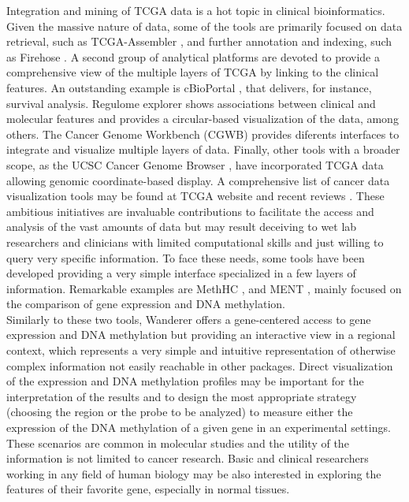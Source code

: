 \documentclass{bmcart}
\begin{document}
Integration and mining of TCGA data is a hot topic in clinical bioinformatics. Given the massive nature of data, some of the tools are primarily focused on data retrieval, such as TCGA-Assembler \cite{zhu2014tcga}, and further annotation and indexing, such as Firehose \cite{firehoseweb}. A second group of analytical platforms are devoted to provide a comprehensive view of the multiple layers of TCGA by linking to the clinical features. An outstanding example is cBioPortal \cite{gao2013integrative}, that delivers, for instance, survival analysis. Regulome explorer \cite{cancer2012comprehensive} shows associations between clinical and molecular features and provides a circular-based visualization of the data, among others. The Cancer Genome Workbench (CGWB) \cite{zhang2010cancer} provides diferents interfaces to integrate and visualize multiple layers of data. Finally, other tools with a broader scope, as the UCSC Cancer Genome Browser \cite{kent2002human}, have incorporated TCGA data allowing genomic coordinate-based display. A comprehensive list of cancer data visualization tools may be found at TCGA website \cite{tcgaanalytical} and recent reviews \cite{plass2013mutations,schroeder2013visualizing}. These ambitious initiatives are invaluable contributions to facilitate the access and analysis of the vast amounts of data but may result deceiving to wet lab researchers and clinicians with limited computational skills and just willing to query very specific information. To face these needs, some tools have been developed providing a very simple interface specialized in a few layers of information. Remarkable examples are MethHC \cite{huang2014methhc}, and MENT \cite{baek2013ment}, mainly focused on the comparison of gene expression and DNA methylation.\\ 

Similarly to these two tools, Wanderer offers a gene-centered access to gene expression and DNA methylation but providing an interactive view in a regional context, which represents a very simple and intuitive representation of otherwise complex information not easily reachable in other packages. Direct visualization of the expression and DNA methylation profiles may be important for the interpretation of the results and to design the most appropriate strategy (choosing the region or the probe to be analyzed) to measure either the expression of the DNA methylation of a given gene in an experimental settings. These scenarios are common in molecular studies and the utility of the information is not limited to cancer research. Basic and clinical researchers working in any field of human biology may be also interested in exploring the features of their favorite gene, especially in normal tissues.\\
\end{document}
